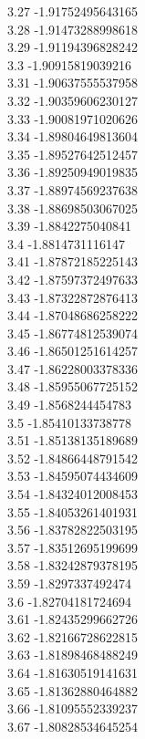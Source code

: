{3.27	-1.91752495643165\\
3.28	-1.91473288998618\\
3.29	-1.91194396828242\\
3.3	-1.90915819039216\\
3.31	-1.90637555537958\\
3.32	-1.90359606230127\\
3.33	-1.90081971020626\\
3.34	-1.89804649813604\\
3.35	-1.89527642512457\\
3.36	-1.89250949019835\\
3.37	-1.88974569237638\\
3.38	-1.88698503067025\\
3.39	-1.8842275040841\\
3.4	-1.8814731116147\\
3.41	-1.87872185225143\\
3.42	-1.87597372497633\\
3.43	-1.87322872876413\\
3.44	-1.87048686258222\\
3.45	-1.86774812539074\\
3.46	-1.86501251614257\\
3.47	-1.86228003378336\\
3.48	-1.85955067725152\\
3.49	-1.8568244454783\\
3.5	-1.85410133738778\\
3.51	-1.85138135189689\\
3.52	-1.84866448791542\\
3.53	-1.84595074434609\\
3.54	-1.84324012008453\\
3.55	-1.84053261401931\\
3.56	-1.83782822503195\\
3.57	-1.83512695199699\\
3.58	-1.83242879378195\\
3.59	-1.8297337492474\\
3.6	-1.82704181724694\\
3.61	-1.82435299662726\\
3.62	-1.82166728622815\\
3.63	-1.81898468488249\\
3.64	-1.81630519141631\\
3.65	-1.81362880464882\\
3.66	-1.81095552339237\\
3.67	-1.80828534645254\\
}
